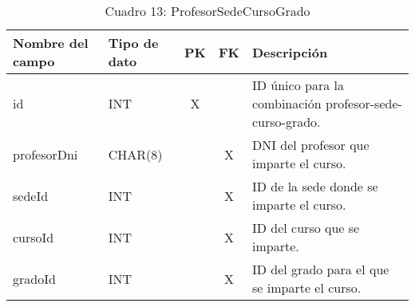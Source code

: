 \begin{table}[H]
	\centering
	\begin{tabular}{|l|l|c|c|l|}
		\hline
		\textbf{Nombre del campo} & \textbf{Tipo de dato} & \textbf{PK} & \textbf{FK} & \textbf{Descripción}                                    \\
		\hline
		id                        & INT                   & X           &             & ID único para la combinación profesor-sede-curso-grado. \\
		\hline
		profesorDni               & CHAR(8)               &             & X           & DNI del profesor que imparte el curso.                  \\
		\hline
		sedeId                    & INT                   &             & X           & ID de la sede donde se imparte el curso.                \\
		\hline
		cursoId                   & INT                   &             & X           & ID del curso que se imparte.                            \\
		\hline
		gradoId                   & INT                   &             & X           & ID del grado para el que se imparte el curso.           \\
		\hline
	\end{tabular}
	\caption{Cuadro 13: ProfesorSedeCursoGrado}
\end{table}